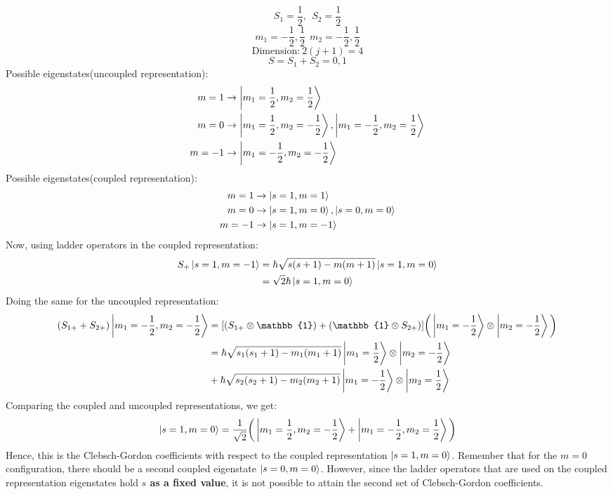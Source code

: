 \documentclass{article}
\begin{document}
\begin{flushleft}
$$S_1=\frac{1}{2},\ \ S_2=\frac{1}{2}$$
$$m_1=-\frac{1}{2},\frac{1}{2}\ \ m_2=-\frac{1}{2},\frac{1}{2}$$
$$\text{Dimension:}\ 2(j+1)=4$$
$$S=S_1+S_2=0,1$$
Possible eigenstates(uncoupled representation):
\begin{align*}
    m=1&\rightarrow\ket{m_1=\frac{1}{2},m_2=\frac{1}{2}}\\
    m=0&\rightarrow\ket{m_1=\frac{1}{2},m_2=-\frac{1}{2}},\ket{m_1=-\frac{1}{2},m_2=\frac{1}{2}}\\
    m=-1&\rightarrow\ket{m_1=-\frac{1}{2},m_2=-\frac{1}{2}}
\end{align*}
Possible eigenstates(coupled representation):
\begin{align*}
    m=1&\rightarrow\ket{s=1,m=1}\\
    m=0&\rightarrow\ket{s=1,m=0},\ket{s=0,m=0}\\
    m=-1&\rightarrow\ket{s=1,m=-1}
\end{align*}
Now, using ladder operators in the coupled representation:
\begin{align*}
    S_+\ket{s=1,m=-1}&=\hbar\sqrt{s(s+1)-m(m+1)}\ket{s=1,m=0}\\
    &=\sqrt{2}\hbar\ket{s=1,m=0}
\end{align*}
Doing the same for the uncoupled representation:
\begin{align*}
    (S_{1+}+S_{2+})\ket{m_1=-\frac{1}{2},m_2=-\frac{1}{2}}&=[(S_{1+}\otimes\mathbb{1})+(\mathbb{1}\otimes S_{2+})]\bigg(\ket{m_1=-\frac{1}{2}}\otimes\ket{m_2=-\frac{1}{2}}\bigg)\\
    &=\hbar\sqrt{s_1(s_1+1)-m_1(m_1+1)}\ket{m_1=\frac{1}{2}}\otimes\ket{m_2=-\frac{1}{2}}\\
    &+\hbar\sqrt{s_2(s_2+1)-m_2(m_2+1)}\ket{m_1=-\frac{1}{2}}\otimes\ket{m_2=\frac{1}{2}}
\end{align*}
Comparing the coupled and uncoupled representations, we get:
$$\ket{s=1,m=0}=\frac{1}{\sqrt{2}}\bigg(\ket{m_1=\frac{1}{2},m_2=-\frac{1}{2}}+\ket{m_1=-\frac{1}{2},m_2=\frac{1}{2}}\bigg)$$
Hence, this is the Clebsch-Gordon coefficients with respect to the coupled representation $\ket{s=1,m=0}$. Remember that for the $m=0$ configuration, there should be a second coupled eigenstate $\ket{s=0,m=0}$. However, since the ladder operators that are used on the coupled representation eigenstates hold \textbf{$s$ as a fixed value}, it is not possible to attain the second set of Clebsch-Gordon coefficients.\\[0.5cm]


\end{flushleft}
\end{document}

